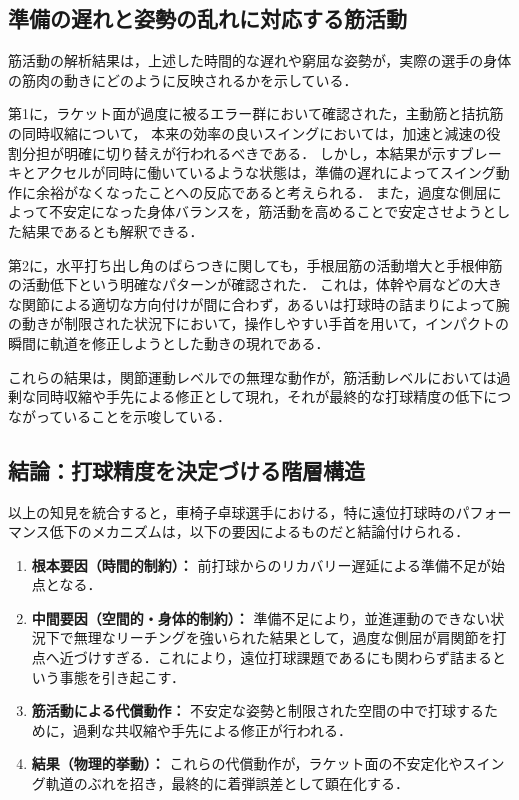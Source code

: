 \documentclass[../main]{subfiles}
\begin{document}
\subsection{準備の遅れと姿勢の乱れに対応する筋活動}
筋活動の解析結果は，上述した時間的な遅れや窮屈な姿勢が，実際の選手の身体の筋肉の動きにどのように反映されるかを示している．

第1に，ラケット面が過度に被るエラー群において確認された，主動筋と拮抗筋の同時収縮について，
本来の効率の良いスイングにおいては，加速と減速の役割分担が明確に切り替えが行われるべきである．
しかし，本結果が示すブレーキとアクセルが同時に働いているような状態は，準備の遅れによってスイング動作に余裕がなくなったことへの反応であると考えられる．
また，過度な側屈によって不安定になった身体バランスを，筋活動を高めることで安定させようとした結果であるとも解釈できる．

第2に，水平打ち出し角のばらつきに関しても，手根屈筋の活動増大と手根伸筋の活動低下という明確なパターンが確認された．
これは，体幹や肩などの大きな関節による適切な方向付けが間に合わず，あるいは打球時の詰まりによって腕の動きが制限された状況下において，操作しやすい手首を用いて，インパクトの瞬間に軌道を修正しようとした動きの現れである．

これらの結果は，関節運動レベルでの無理な動作が，筋活動レベルにおいては過剰な同時収縮や手先による修正として現れ，それが最終的な打球精度の低下につながっていることを示唆している．

\subsection{結論：打球精度を決定づける階層構造}
以上の知見を統合すると，車椅子卓球選手における，特に遠位打球時のパフォーマンス低下のメカニズムは，以下の要因によるものだと結論付けられる．

\begin{enumerate}
    \item \textbf{根本要因（時間的制約）：}
    前打球からのリカバリー遅延による準備不足が始点となる．

    \item \textbf{中間要因（空間的・身体的制約）：}
    準備不足により，並進運動のできない状況下で無理なリーチングを強いられた結果として，過度な側屈が肩関節を打点へ近づけすぎる．これにより，遠位打球課題であるにも関わらず詰まるという事態を引き起こす．

    \item \textbf{筋活動による代償動作：}
    不安定な姿勢と制限された空間の中で打球するために，過剰な共収縮や手先による修正が行われる．

    \item \textbf{結果（物理的挙動）：}
    これらの代償動作が，ラケット面の不安定化やスイング軌道のぶれを招き，最終的に着弾誤差として顕在化する．
\end{enumerate}
\end{document}
